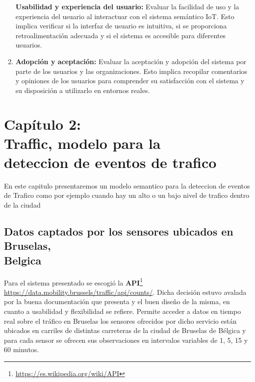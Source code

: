 \documentclass[12pt]{article}
\begin{document}
\begin{enumerate}
{        \textbf{Usabilidad y experiencia del usuario:} \citep{ref10} Evaluar la facilidad de uso y la experiencia del usuario al interactuar con el sistema semántico IoT. Esto implica verificar si la interfaz de usuario es intuitiva, si se proporciona retroalimentación adecuada y si el sistema es accesible para diferentes usuarios.
    }
    \item {
        
        \textbf{Adopción y aceptación:} Evaluar la aceptación y adopción del sistema por parte de los usuarios y las organizaciones. Esto implica recopilar comentarios y opiniones de los usuarios para comprender su satisfacción con el sistema y su disposición a utilizarlo en entornos reales.
    }
        
\end{enumerate}




\newpage
\vspace*{3cm}
\section[Traffic: modelo para la deteccion de eventso de traficos]{\texorpdfstring{Cap\'itulo 2:\\ Traffic, modelo para la\\ deteccion de eventos de trafico}{Cap\'itulo 2:\\ Traffic, modelo para la\\ deteccion de eventos de trafico}}

\vspace*{1cm}

En este capitulo presentaremos un modelo semantico para la deteccion de eventos de Trafico como por ejemplo cuando hay un alto o un bajo nivel de trafico dentro de la ciudad

\subsection{ Datos captados por los sensores ubicados en Bruselas, \\ Belgica }

Para el sistema presentado se escogió la \textbf{API}\footnote{\href{{https://es.wikipedia.org/wiki/API}}{\url{https://es.wikipedia.org/wiki/API}}} \url{https://data.mobility.brussels/traffic/api/counts/}. Dicha decisión estuvo avalada por la buena documentación que presenta y el buen diseño de la misma, en cuanto a usabilidad y flexibilidad se refiere. Permite acceder a datos en tiempo real sobre el tráfico en Bruselas los sensores ofrecidos por dicho servicio están ubicados en carriles de distintas carreteras de la ciudad de Bruselas de Bélgica y para cada sensor se ofrecen sus observaciones en intervalos variables de 1, 5, 15 y 60 minutos.
\end{document}
